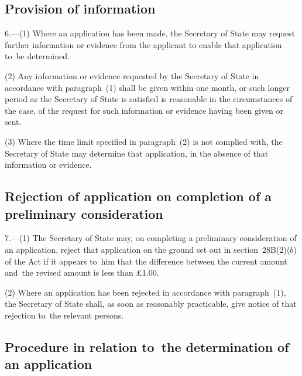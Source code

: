 \documentclass[12pt,a4paper]{article}
\begin{document}
\subsection[6. Provision of information]{Provision of information}

6.—(1) Where an application has been made, the Secretary
of State may request further information or evidence from the applicant to
enable that application to~be determined.

(2) Any information or evidence requested by the Secretary of State in accordance with paragraph~(1) shall be given within 
one month, or such longer period as the Secretary of State is satisfied is reasonable in the circumstances of the case,  %
of the request for such information or evidence having been given or sent.

(3) Where the time limit specified in paragraph~(2) is not complied with, the
Secretary of State may determine that application, in the absence of that
information or evidence.


\subsection[7. Rejection of application on completion of a preliminary consideration]{Rejection of application on completion of a preliminary consideration}

7.—(1) The
Secretary of State may, on completing a preliminary consideration of an
application, reject that application on the ground set out in section~28B(2)($b$)
of the Act if it appears to~him that the difference between the current amount
and~the revised amount is less than £1$.$00.

(2) Where an application has been rejected in accordance with paragraph~(1), the
Secretary of State shall, as soon as reasonably practicable, give notice of that
rejection to~the relevant persons.

\subsection[8. Procedure in relation to~the determination of an application]{Procedure in relation to~the determination of an application}
\end{document}
